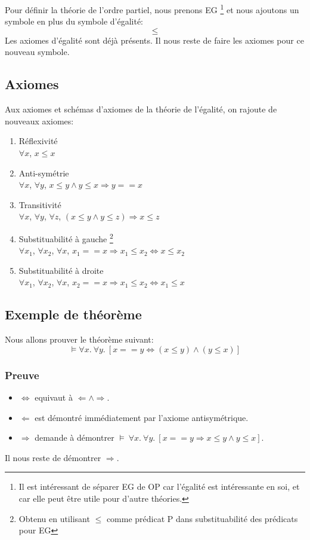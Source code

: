 {Pour définir la théorie de l'ordre partiel, nous prenons EG \footnote{Il est intéressant de séparer EG de OP car l'égalité est intéressante en soi, et car elle peut être utile pour d'autre théories.} et nous ajoutons un symbole en
plus du symbole d'égalité:
	$$\leq$$
Les axiomes d'égalité sont déjà présents.
Il nous reste de faire les axiomes pour ce nouveau symbole.

\subsection{Axiomes} 

Aux axiomes et schémas d'axiomes de la théorie de l'égalité, on rajoute de nouveaux axiomes:
\begin{enumerate}
\item Réflexivité \\$\forall x$, $x\leq x$
\item Anti-symétrie \\$\forall x$, $\forall y$, $ x\leq y \land y\leq x\Rightarrow y==x$
\item Transitivité \\$\forall x$, $\forall y$, $\forall z$, $(x\leq y \land y\leq z) \Rightarrow x\leq z$
\item Substituabilité à gauche \footnote{Obtenu en utilisant $\leq$ comme prédicat P dans substituabilité des prédicats pour EG} \\$\forall x_{1}$, $\forall x_{2}$, $\forall x$,  $x_{1}==x \Rightarrow x_{1}\leq x_{2} \Leftrightarrow x \leq x_{2}$
\item Substituabilité à droite \\$\forall x_{1}$, $\forall x_{2}$, $\forall x$,  $x_{2}==x \Rightarrow x_{1}\leq x_{2} \Leftrightarrow x_{1} \leq x$
\end{enumerate}

\subsection{Exemple de théorème}

Nous allons prouver le théorème suivant:
$$\models \forall x.\ \forall y.\  [x==y \Leftrightarrow (x\leq y)\land (y \leq x)] $$

\subsubsection{Preuve}

\begin{itemize}
\item $\Leftrightarrow$ equivaut à $\Leftarrow \land \Rightarrow$.
\item $\Leftarrow$ est démontré immédiatement par l'axiome antisymétrique.
\item $\Rightarrow$ demande à démontrer $\models{}\ \forall x.\ \forall y.\ [x==y \Rightarrow x\leq y \land y \leq x]$.
\end{itemize}
Il nous reste de démontrer $\Rightarrow$.

}
